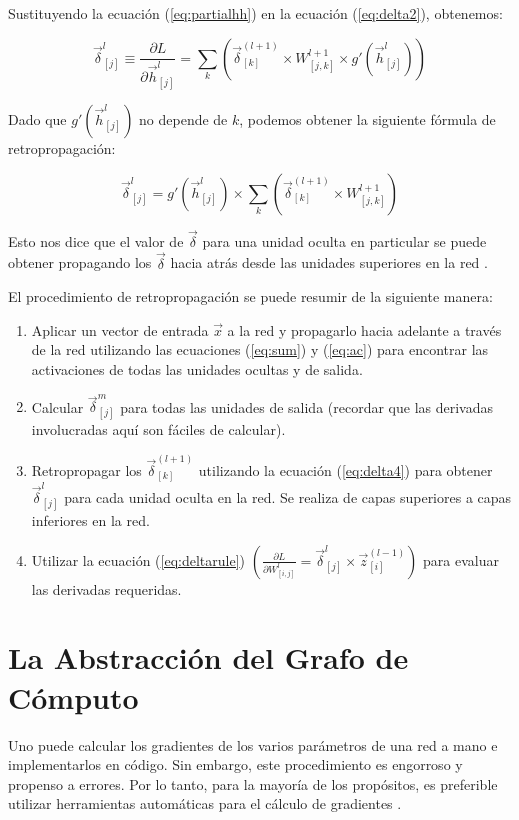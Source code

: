 Sustituyendo la ecuación (\ref{eq:partialhh}) en la ecuación (\ref{eq:delta2}), obtenemos:

\begin{equation}
\vec{\delta}_{[j]}^l \equiv \frac{\partial L}{\partial \vec{h}_{[j]}^l} = \sum_{k} \left( \vec{\delta}_{[k]}^{(l+1)}  \times W_{[j,k]}^{l+1} \times g'(\vec{h}_{[j]}^{l}) \right)
\label{eq:delta3}
\end{equation}

Dado que $g'(\vec{h}_{[j]}^{l})$ no depende de $k$, podemos obtener la siguiente fórmula de retropropagación:

\begin{equation}
\vec{\delta}_{[j]}^l = g'(\vec{h}_{[j]}^{l}) \times \sum_{k} \left( \vec{\delta}_{[k]}^{(l+1)}  \times W_{[j,k]}^{l+1}\right)
\label{eq:delta4}
\end{equation}

Esto nos dice que el valor de $\vec{\delta}$ para una unidad oculta en particular se puede obtener propagando los $\vec{\delta}$ hacia atrás desde las unidades superiores en la red \cite{bishop2006pattern}.

El procedimiento de retropropagación se puede resumir de la siguiente manera:

\begin{enumerate}
  \item Aplicar un vector de entrada $\vec{x}$ a la red y propagarlo hacia adelante a través de la red utilizando las ecuaciones (\ref{eq:sum}) y (\ref{eq:ac}) para encontrar las activaciones de todas las unidades ocultas y de salida.
  \item Calcular $\vec{\delta}_{[j]}^m$ para todas las unidades de salida (recordar que las derivadas involucradas aquí son fáciles de calcular).
  \item Retropropagar los $\vec{\delta}_{[k]}^{(l+1)}$ utilizando la ecuación (\ref{eq:delta4}) para obtener $\vec{\delta}_{[j]}^l$ para cada unidad oculta en la red. Se realiza de capas superiores a capas inferiores en la red.
  \item Utilizar la ecuación (\ref{eq:deltarule}) $(\frac{\partial L}{\partial W_{[i,j]}^l} = \vec{\delta}_{[j]}^l \times \vec{z}_{[i]}^{(l-1)})$ para evaluar las derivadas requeridas.
\end{enumerate}
\section{La Abstracción del Grafo de Cómputo}
Uno puede calcular los gradientes de los varios parámetros de una red a mano e implementarlos en código. Sin embargo, este procedimiento es engorroso y propenso a errores. Por lo tanto, para la mayoría de los propósitos, es preferible utilizar herramientas automáticas para el cálculo de gradientes \cite{bengio2012practical}.

